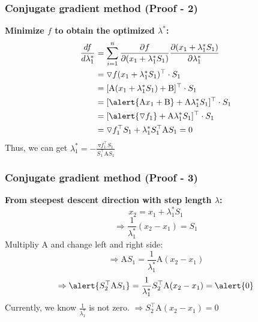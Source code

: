 \documentclass{beamer}
\begin{document}
\begin{frame}
    \frametitle{Conjugate gradient method (Proof - 2)}
\textbf{Minimize $f$ to obtain the optimized $\lambda^*$:}
\begin{align*}
    \frac{df}{d\lambda_1^*}&=\sum^n_{i=1}\frac{\partial f}{\partial (x_1+\lambda_1^*S_1)}\frac{\partial (x_1+\lambda_1^*S_1)}{\partial \lambda_1^*}\\
    &=\triangledown f(x_1+\lambda_1^*S_1)^\top\cdot S_1 \\
    &=[\textrm{A}(x_1+\lambda_1^*S_1)+\textrm{B}]^\top\cdot S_1 \\
    &=[\alert{\textrm{A}x_1+\textrm{B}}+\textrm{A}\lambda_1^*S_1]^\top\cdot S_1 \\
    &=[\alert{\triangledown f_1}+\textrm{A}\lambda_1^*S_1]^\top\cdot S_1 \\
    &=\triangledown f_1^\top S_1+\lambda_1^*S_1^\top \textrm{A}S_1=0
\end{align*}
Thus, we can get $\lambda_1^*=-\frac{\triangledown f_1^\top S_1}{S_1^\top \textrm{A}S_1}$
\end{frame}

\begin{frame}
    \frametitle{Conjugate gradient method (Proof - 3)}
    \textbf{From steepest descent direction with step length $\lambda$:}
    $$x_2=x_1+\lambda_1^*S_1$$
    $$\Rightarrow \frac{1}{\lambda_1^*}(x_2-x_1)=S_1$$
    Multipliy $\textrm{A}$ and change left and right side:
    $$\Rightarrow \textrm{A}S_1=\frac{1}{\lambda_1^*}\textrm{A}(x_2-x_1)$$
    $$\Rightarrow \alert{S_2^\top\text{A}S_1}=\frac{1}{\lambda_1^*}S_2^\top\textrm{A}(x_2-x_1)=\alert{0}$$
    Currently, we know $\frac{1}{\lambda_1^*}$ is not zero. $\Rightarrow S_2^\top\textrm{A}(x_2-x_1)=0$
\end{frame}
\end{document}
